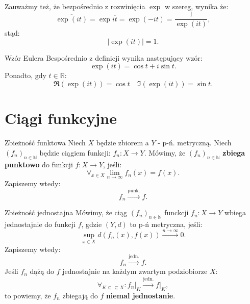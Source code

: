 \documentclass{article}
\newcounter{defi}
\numberwithin{defi}{section}
\numberwithin{defi}{section}
\newcommand{\R}{\mathbb{R}}
\newcommand{\N}{\mathbb{N}}
\newcommand{\oo}{\infty}
\newcommand{\se}{\subseteq}
\providecommand{\ol}{\overline}
\newcommand{\tb}[1]{\textbf{#1}}
\newcommand{\ciag}[1]{(#1_{n})_{n \in \N}}
\newcommand{\topunk}{\xrightarrow{\text{punk.}}}
\newcommand{\tojedn}{\xrightarrow{\text{jedn.}}}
\begin{document}
\paragraph{} Zauważmy też, że bezpośrednio z rozwinięcia $\exp$ w szereg, wynika że: \begin{equation}
    \ol{\exp(it)} = \exp{\ol{it}} = \exp(-it) = \frac{1}{\exp(it)},
\end{equation} stąd: \begin{equation}
    | \exp(it) | = 1.
\end{equation}




\begin{obs}{Wzór Eulera}
    Bespośrednio z definicji wynika następujący wzór: \begin{equation}
        \exp(it) = \cos t + i \sin t.
    \end{equation}
    Ponadto, gdy $t \in \R$: \begin{equation}
        \Re(\exp(it)) = \cos t \quad \Im(\exp(it)) = \sin t.
    \end{equation}
\end{obs}



\newpage
\section{Ciągi funkcyjne}


\begin{defr}{Zbieżność funktowa}
    Niech $X$ będzie zbiorem a $Y$ - p-ń. metryczną. Niech $\ciag{f}$ będzie ciągiem funkcji: $f_n: X \to Y$. Mówimy, że $\ciag{f}$ \tb{zbiega punktowo} do funkcji $f: X \to Y$, jeśli: \begin{equation}
        \forall_{x \in X} \lim_{n \to \oo} f_n(x) = f(x).
    \end{equation} Zapiszemy wtedy: \begin{equation}
        f_n \topunk f.
    \end{equation}
\end{defr}

\begin{defr}{Zbieżność jednostajna}
    Mówimy, że ciąg $\ciag{f}$ funckcji $f_n: X \to Y$ wbiega jednostajnie do funkcji $f$, gdzie $(Y,d)$ to p-ń metryczna, jeśli: \begin{equation}
        \sup_{x \in X} d(f_n(x), f(x)) \xrightarrow{n \to \oo} 0.
    \end{equation} Zapiszemy wtedy: \begin{equation}
        f_n \tojedn f.
    \end{equation} Jeśli $f_n$ dążą do $f$ jednostajnie na każdym zwartym podziobiorze $X$: \begin{equation}
        \forall_{K \se \se X}: f_n \big|_{K} \tojedn f \big|_K,
    \end{equation} to powiemy, że $f_n$ zbiegają do $f$ \tb{niemal jednostanie}.
\end{defr}
\end{document}

